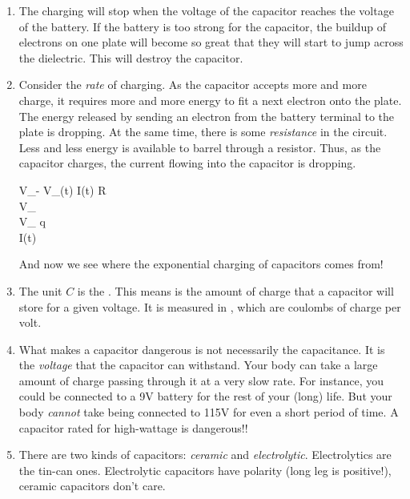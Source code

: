 \documentclass[11pt, oneside]{amsart}
\begin{document}
\begin{enumerate}
  \item The charging will stop when the voltage of the capacitor reaches
  the voltage of the battery. If the battery is too strong for the
  capacitor, the buildup of electrons on one plate will become so great
  that they will start to jump across the dielectric. This will destroy
  the capacitor.

  \item Consider the \emph{rate} of charging. As the capacitor accepts
  more and more charge, it requires more and more energy to fit a next
  electron onto the plate. The energy released by sending an electron
  from the battery terminal to the plate is dropping. At the same time,
  there is some \emph{resistance} in the circuit. Less and less energy
  is available to barrel through a resistor. Thus, as the capacitor
  charges, the current flowing into the capacitor is dropping.

\newcommand{\vbat}{V_}
\newcommand{\vcap}{V_}

  \begin{nedqn}
    \vbat - \vcap(t)
  \eqcol
    I(t) R
  \\
     \vcap
  \eqcol
  \\
     \vcap
  \eqcol
     q 
  \\\eqcol
    I(t) 
  \\\eqcol
    \frac{\vbat - \vcap(t)}{RC}
  \end{nedqn}

  \noindent
  And now we see where the exponential charging of capacitors comes
  from!

  \item The unit $C$ is the . This means is the
  amount of charge that a capacitor will store for a given voltage. It
  is measured in , which are coulombs of charge per volt.

  \item What makes a capacitor dangerous is not necessarily the
  capacitance. It is the \emph{voltage} that the capacitor can
  withstand. Your body can take a large amount of charge passing through
  it at a very slow rate. For instance, you could be connected to a 9V
  battery for the rest of your (long) life. But your body \emph{cannot}
  take being connected to 115V for even a short period of time. A
  capacitor rated for high-wattage is dangerous!!

  \item There are two kinds of capacitors: \emph{ceramic} and
  \emph{electrolytic}. Electrolytics are the tin-can ones. Electrolytic
  capacitors have polarity (long leg is positive!), ceramic capacitors
  don't care. 

\end{enumerate}
\end{document}
